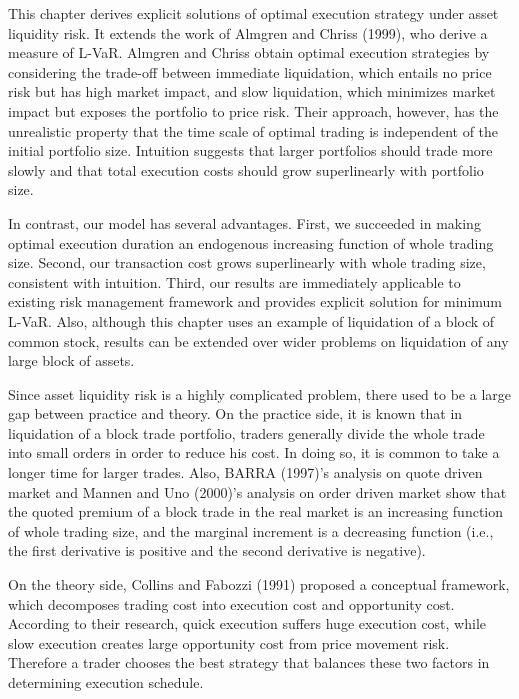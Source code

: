 This chapter derives explicit solutions of optimal execution strategy under asset liquidity risk.  It extends the work of Almgren and Chriss (1999), who derive a measure of L-VaR.  Almgren and Chriss obtain optimal execution strategies by considering the trade-off between immediate liquidation, which entails no price risk but has high market impact, and slow liquidation, which minimizes market impact but exposes the portfolio to price risk.  Their approach, however, has the unrealistic property that the time scale of optimal trading is independent of the initial portfolio size.  Intuition suggests that larger portfolios should trade more slowly and that total execution costs should grow superlinearly with portfolio size.

In contrast, our model has several advantages.  First, we succeeded in making optimal execution duration an endogenous increasing function of whole trading size.  Second, our transaction cost grows superlinearly with whole trading size, consistent with intuition.  Third, our results are immediately applicable to existing risk management framework and provides explicit solution for minimum L-VaR.  Also, although this chapter uses an example of liquidation of a block of common stock, results can be extended over wider problems on liquidation of any large block of assets.

Since asset liquidity risk is a highly complicated problem, there used to be a large gap between practice and theory.  On the practice side, it is known that in liquidation of a block trade portfolio, traders generally divide the whole trade into small orders in order to reduce his cost.  In doing so, it is common to take a longer time for larger trades.  Also, BARRA (1997)'s analysis on quote driven market and Mannen and Uno (2000)'s analysis on order driven market show that the quoted premium of a block trade in the real market is an increasing function of whole trading size, and the marginal increment is a decreasing function (i.e., the first derivative is positive and the second derivative is negative).  

On the theory side,  Collins and Fabozzi (1991) proposed a conceptual framework, which decomposes trading cost into execution cost and opportunity cost.  According to their research, quick execution suffers huge execution cost, while slow execution creates large opportunity cost from price movement risk.  Therefore a trader chooses the best strategy that balances these two factors in determining execution schedule.

